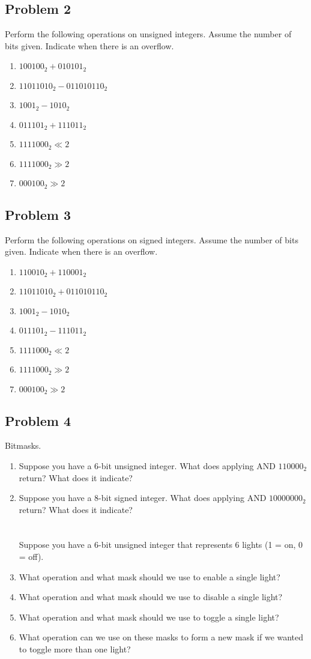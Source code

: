 \documentclass{article}
\begin{document}
\subsection*{Problem 2}
Perform the following operations on unsigned integers. Assume the number of bits given. Indicate when there is an overflow.
\begin{enumerate}[label=\alph*.]
    \item $100100_2 + 010101_2$
    \item $11011010_2 - 011010110_2$
    \item $1001_2 - 1010_2$
    \item $011101_2 + 111011_2$
    \item $1111000_2 \ll 2$ 
    \item $1111000_2 \gg 2$
    \item $000100_2 \gg 2$
\end{enumerate}

\subsection*{Problem 3}
Perform the following operations on signed integers. Assume the number of bits given. Indicate when there is an overflow.
\begin{enumerate}[label=\alph*.]
    \item $110010_2 + 110001_2$
    \item $11011010_2 + 011010110_2$
    \item $1001_2 - 1010_2$
    \item $011101_2 - 111011_2$
    \item $1111000_2 \ll 2$ 
    \item $1111000_2 \gg 2$
    \item $000100_2 \gg 2$
\end{enumerate}

\subsection*{Problem 4}
Bitmasks.
\begin{enumerate}[label=\alph*.]
    \item Suppose you have a 6-bit unsigned integer. What does applying AND $110000_2$ return? What does it indicate? 
    \item Suppose you have a 8-bit signed integer. What does applying AND $10000000_2$ return? What does it indicate? \\ \\ \\
    Suppose you have a 6-bit unsigned integer that represents 6 lights (1 = on, 0 = off).
    \item What operation and what mask should we use to enable a single light?
    \item What operation and what mask should we use to disable a single light?
    \item What operation and what mask should we use to toggle a single light?
    \item What operation can we use on these masks to form a new mask if we wanted to toggle more than one light?
\end{enumerate}
\end{document}
